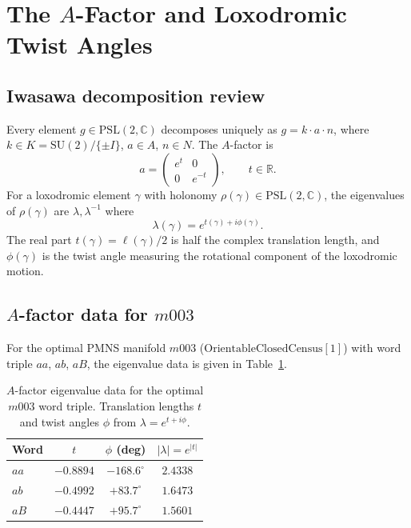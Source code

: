 \documentclass[11pt,a4paper]{article}
\begin{document}
\section{The $A$-Factor and Loxodromic Twist Angles}
\label{sec:afactor}

\subsection{Iwasawa decomposition review}
\label{subsec:iwasawa}

Every element $g \in \mathrm{PSL}(2,\mathbb{C})$ decomposes uniquely
as $g = k \cdot a \cdot n$, where
$k \in K = \mathrm{SU}(2)/\{\pm I\}$, $a \in A$, $n \in N$.  The
$A$-factor is
\begin{equation}
  a = \begin{pmatrix} e^{t} & 0 \\ 0 & e^{-t} \end{pmatrix},
  \qquad t \in \mathbb{R}.
  \label{eq:afactor}
\end{equation}
For a loxodromic element $\gamma$ with holonomy
$\rho(\gamma) \in \mathrm{PSL}(2,\mathbb{C})$, the eigenvalues of
$\rho(\gamma)$ are $\lambda,\lambda^{-1}$ where
\begin{equation}
  \lambda(\gamma) = e^{t(\gamma)+i\phi(\gamma)}.
  \label{eq:eigenvalue}
\end{equation}
The real part $t(\gamma) = \ell(\gamma)/2$ is half the complex
translation length, and $\phi(\gamma)$ is the twist angle measuring
the rotational component of the loxodromic motion.

\subsection{$A$-factor data for $m003$}
\label{subsec:adata}

For the optimal PMNS manifold $m003$
($\mathrm{OrientableClosedCensus}[1]$) with word triple $aa$, $ab$,
$aB$, the eigenvalue data is given in Table~\ref{tab:afactor-m003}.

\begin{table}[ht]
\caption{$A$-factor eigenvalue data for the optimal $m003$ word
  triple.  Translation lengths $t$ and twist angles $\phi$ from
  $\lambda = e^{t+i\phi}$.}
\label{tab:afactor-m003}
\centering
\begin{tabular}{lccc}
\toprule
Word & $t$ & $\phi$ (deg) & $|\lambda| = e^{|t|}$ \\
\midrule
$aa$ & $-0.8894$ & $-168.6^\circ$ & $2.4338$ \\
$ab$ & $-0.4992$ & $+83.7^\circ$  & $1.6473$ \\
$aB$ & $-0.4447$ & $+95.7^\circ$  & $1.5601$ \\
\bottomrule
\end{tabular}
\end{table}
\end{document}

